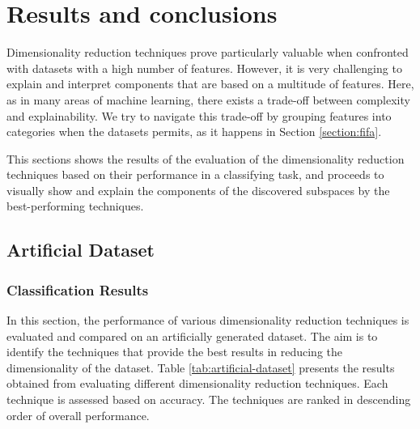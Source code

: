 
\chapter{Results and conclusions}

Dimensionality reduction techniques prove particularly valuable when confronted with datasets with a high number of features. However, it is very challenging to explain and interpret components that are based on a multitude of features. Here, as in many areas of machine learning, there exists a trade-off between complexity and explainability. We try to navigate this trade-off by grouping features into categories when the datasets permits, as it happens in Section \ref{section:fifa}.

This sections shows the results of the evaluation of the dimensionality reduction techniques based on their performance in a classifying task, and proceeds to visually show and explain the components of the discovered subspaces by the best-performing techniques.

\section{Artificial Dataset}

\subsection{Classification Results}
In this section, the performance of various dimensionality reduction techniques is evaluated and compared on an artificially generated dataset. The aim is to identify the techniques that provide the best results in reducing the dimensionality of the dataset.
Table \ref{tab:artificial-dataset} presents the results obtained from evaluating different dimensionality reduction techniques. Each technique is assessed based on accuracy. The techniques are ranked in descending order of overall performance.

